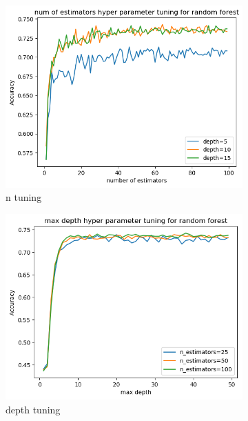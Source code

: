 \documentclass[12pt]{article}
\begin{document}
\begin{figure}[h]
\centering
\begin{subfigure}{0.3\textwidth}
  \centering
  \includegraphics[width=1\linewidth]{Cross_valid_plots/n_hyper_forest_fig}
  \caption{n tuning}
  \label{fig:sub1}
\end{subfigure}%
\begin{subfigure}{0.3\textwidth}
  \centering
  \includegraphics[width=1\linewidth]{Cross_valid_plots/d_hyper_forest_fig}
  \caption{depth tuning}
  \label{fig:sub1}
\end{subfigure}%
\begin{subfigure}{0.3\textwidth}
  \centering

\end{subfigure}
\end{figure}
\end{document}
